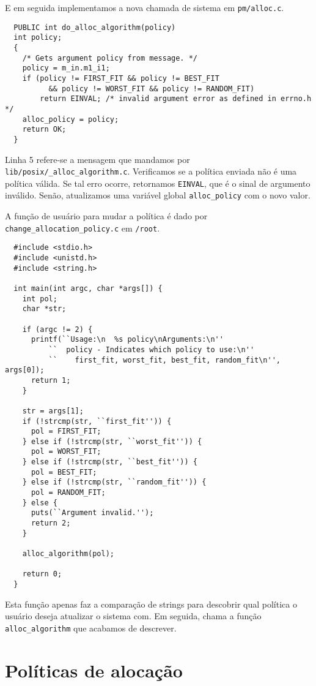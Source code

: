 \documentclass{amsart}
\theoremstyle{plain}
\newcommand{\code}[1]{\lstinline[mathescape=true]{#1}}
\begin{document}
E em seguida implementamos a nova chamada de sistema em \code{pm/alloc.c}.

\begin{verbatim}
  PUBLIC int do_alloc_algorithm(policy)
  int policy;
  {
    /* Gets argument policy from message. */
    policy = m_in.m1_i1;
    if (policy != FIRST_FIT && policy != BEST_FIT
          && policy != WORST_FIT && policy != RANDOM_FIT)
        return EINVAL; /* invalid argument error as defined in errno.h */
    alloc_policy = policy;
    return OK;
  }
\end{verbatim}

Linha 5 refere-se a mensagem que mandamos por \code{lib/posix/_alloc_algorithm.c}. Verificamos se
a política enviada não é uma política válida. Se tal erro ocorre, retornamos \code{EINVAL}, que é o
sinal de argumento inválido. Senão, atualizamos uma variável global \code{alloc_policy} com o novo
valor.

A função de usuário para mudar a política é dado por \code{change_allocation_policy.c} em
\code{/root}.

\begin{verbatim}
  #include <stdio.h>
  #include <unistd.h>
  #include <string.h>

  int main(int argc, char *args[]) {
    int pol;
    char *str;

    if (argc != 2) {
      printf(``Usage:\n  %s policy\nArguments:\n''
          ``  policy - Indicates which policy to use:\n''
          ``    first_fit, worst_fit, best_fit, random_fit\n'', args[0]);
      return 1;
    }

    str = args[1];
    if (!strcmp(str, ``first_fit'')) {
      pol = FIRST_FIT;
    } else if (!strcmp(str, ``worst_fit'')) {
      pol = WORST_FIT;
    } else if (!strcmp(str, ``best_fit'')) {
      pol = BEST_FIT;
    } else if (!strcmp(str, ``random_fit'')) {
      pol = RANDOM_FIT;
    } else {
      puts(``Argument invalid.'');
      return 2;
    }

    alloc_algorithm(pol);

    return 0;
  }
\end{verbatim}

Esta função apenas faz a comparação de strings para descobrir qual política o usuário deseja
atualizar o sistema com. Em seguida, chama a função \code{alloc_algorithm} que acabamos de
descrever.

\section{Políticas de alocação}
\end{document}
